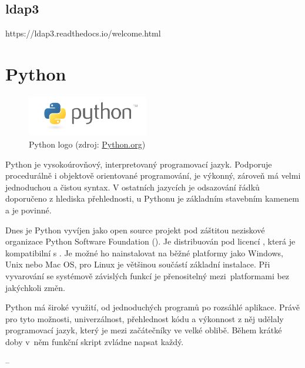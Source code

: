 \subsection{ldap3}
https://ldap3.readthedocs.io/welcome.html

\section{Python}

\begin{figure}[H] \centering
      \includegraphics[width=150pt]{./pictures/python-logo-master-v3-TM.png}
      \caption[Python logo]{Python logo (zdroj:
\href{https://www.python.org/static/community_logos/python-logo-master-v3-TM.png}{Python.org})}
      \label{fig:python}
  \end{figure}
  

Python je vysokoúrovňový, interpretovaný programovací jazyk. Podporuje
procedurálně i objektově orientované programování, je výkonný, zároveň
má velmi jednoduchou a čistou syntax. V ostatních jazycích je
odsazování řádků doporučeno z hlediska přehlednosti, u Pythonu je
základním stavebním kamenem a je povinné.\cite{Kulovana, 2017}

Dnes je Python vyvíjen jako open source projekt
pod záštitou neziskové organizace Python Software Foundation
(). Je distribuován pod licencí , která je
kompatibilní s . Je možné ho nainstalovat na běžné platformy
jako Windows, Unix nebo Mac OS, pro Linux je většinou součástí
základní instalace. Při vyvarování se systémově závislých funkcí je
přenositelný mezi~platformami bez jakýchkoli změn.

Python má široké využití, od jednoduchých programů po rozsáhlé
aplikace. Právě pro tyto možnosti, univerzálnost, přehlednost kódu a
výkonnost z něj udělaly programovací jazyk, který je mezi začátečníky ve
velké oblibě. Během krátké doby v~něm funkční skript zvládne napsat
každý.

--


